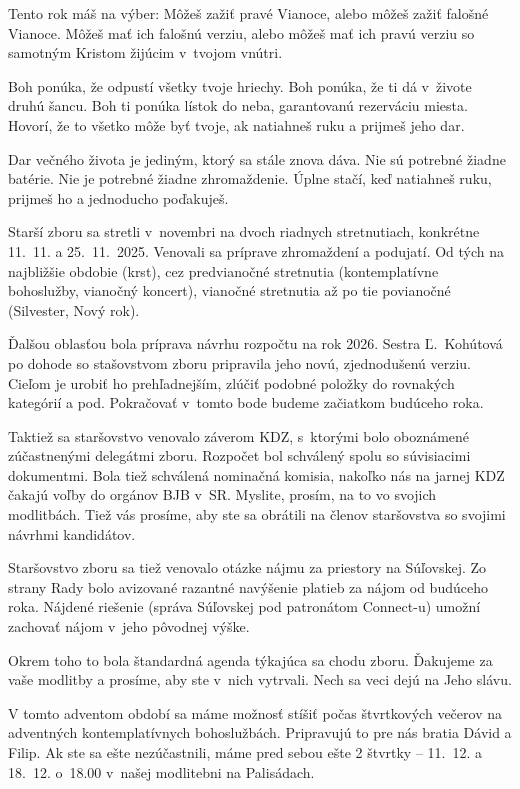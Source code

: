 Tento rok máš na výber: Môžeš zažiť pravé Vianoce, alebo môžeš zažiť falošné Vianoce. Môžeš mať ich falošnú verziu, alebo môžeš mať ich pravú verziu so samotným Kristom žijúcim v~tvojom vnútri.

Boh ponúka, že odpustí všetky tvoje hriechy. Boh ponúka, že ti dá v~živote druhú šancu. Boh ti ponúka lístok do neba, garantovanú rezerváciu miesta. Hovorí, že to všetko môže byť tvoje, ak natiahneš ruku a prijmeš jeho dar.

Dar večného života je jediným, ktorý sa stále znova dáva. Nie sú potrebné žiadne batérie. Nie je potrebné žiadne zhromaždenie. Úplne stačí, keď natiahneš ruku, prijmeš ho a jednoducho poďakuješ.



Starší zboru sa stretli v~novembri na dvoch riadnych stretnutiach, konkrétne 11.~11. a 25.~11.~2025. Venovali sa príprave zhromaždení a podujatí. Od tých na najbližšie obdobie (krst), cez predvianočné stretnutia (kontemplatívne bohoslužby, vianočný koncert), vianočné stretnutia až po tie povianočné (Silvester, Nový rok).

Ďalšou oblasťou bola príprava návrhu rozpočtu na rok 2026. Sestra Ľ.~Kohútová po dohode so stašovstvom zboru pripravila jeho novú, zjednodušenú verziu. Cieľom je urobiť ho prehľadnejším, zlúčiť podobné položky do rovnakých kategórií a pod. Pokračovať v~tomto bode budeme začiatkom budúceho roka.

Taktiež sa staršovstvo venovalo záverom KDZ, s~ktorými bolo oboznámené zúčastnenými delegátmi zboru. Rozpočet bol schválený spolu so súvisiacimi dokumentmi. Bola tiež schválená nominačná komisia, nakoľko nás na jarnej KDZ čakajú voľby do orgánov BJB v~SR. Myslite, prosím, na to vo svojich modlitbách. Tiež vás prosíme, aby ste sa obrátili na členov staršovstva so svojimi návrhmi kandidátov.

Staršovstvo zboru sa tiež venovalo otázke nájmu za priestory na Súľovskej. Zo strany Rady bolo avizované razantné navýšenie platieb za nájom od budúceho roka. Nájdené riešenie (správa Súľovskej pod patronátom Connect-u) umožní zachovať nájom v~jeho pôvodnej výške.

Okrem toho to bola štandardná agenda týkajúca sa chodu zboru. Ďakujeme za vaše modlitby a prosíme, aby ste v~nich vytrvali. Nech sa veci dejú na Jeho slávu.
\vfill\break


V tomto adventom období sa máme možnosť stíšiť počas štvrtkových večerov na adventných kontemplatívnych bohoslužbách. Pripravujú to pre nás bratia Dávid a Filip. Ak ste sa ešte nezúčastnili, máme pred sebou ešte 2 štvrtky -- 11.~12. a 18.~12. o~18.00 v~našej modlitebni na Palisádach.

